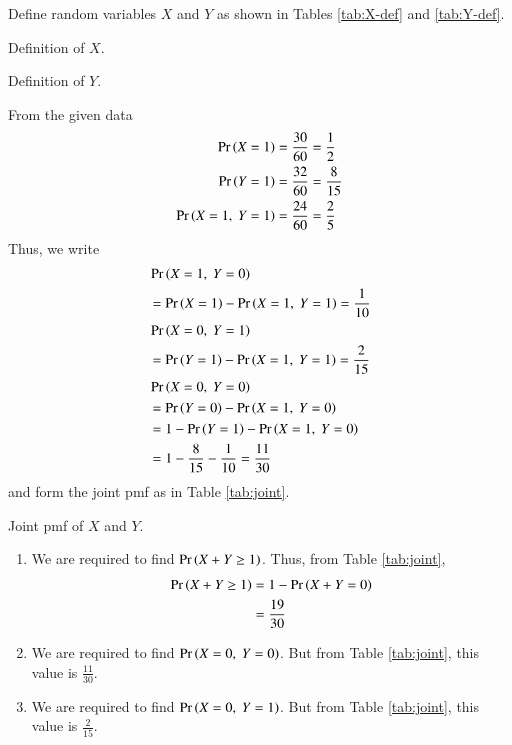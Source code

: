 \documentclass[journal,12pt,twocolumn]{IEEEtran}
\begin{document}
\begin{enumerate}
    \solution Define random variables $X$ and $Y$ as shown
    in Tables \ref{tab:X-def} and \ref{tab:Y-def}.
    \begin{table}[H]
        \centering
        
        \caption{Definition of $X$.}
        \label{tab:X-def}
    \end{table}
    \begin{table}[H]
        \centering
        
        \caption{Definition of $Y$.}
        \label{tab:Y-def}
    \end{table}
    From the given data
    \begin{align}
        \Pr\left(X=1\right) &= \frac{30}{60} = \frac{1}{2} \label{eq:pr-X} \\
        \Pr\left(Y=1\right) &= \frac{32}{60} = \frac{8}{15} \label{eq:pr-Y} \\
        \Pr\left(X=1,\ Y=1\right) &= \frac{24}{60} = \frac{2}{5} \label{eq:pr-XY}
    \end{align}
    Thus, we write
    \begin{align}
        &\Pr\left(X=1,\ Y=0\right) \nonumber \\
        &= \Pr\left(X=1\right) - \Pr\left(X=1,\ Y=1\right) = \frac{1}{10} \\
        &\Pr\left(X=0,\ Y=1\right) \nonumber \\
        &= \Pr\left(Y=1\right) - \Pr\left(X=1,\ Y=1\right) = \frac{2}{15} \\
        &\Pr\left(X=0,\ Y=0\right) \nonumber \\
        &= \Pr\left(Y=0\right) - \Pr\left(X=1,\ Y=0\right) \\
        &= 1 - \Pr\left(Y=1\right) - \Pr\left(X=1,\ Y=0\right) \\
        &= 1 - \frac{8}{15} - \frac{1}{10} = \frac{11}{30}
    \end{align}
    and form the joint pmf as in Table \ref{tab:joint}.
    \begin{table}[H]
        \centering
        
        \caption{Joint pmf of $X$ and $Y$.}
        \label{tab:joint}
    \end{table}
    \begin{enumerate}
        \item We are required to find $\Pr\left(X+Y\ge1\right)$. Thus, from Table 
        \ref{tab:joint},
        \begin{align}
            \Pr\left(X+Y\ge1\right) &= 1 - \Pr\left(X+Y=0\right) \\
                         &= \frac{19}{30}
        \end{align}
        
        \item We are required to find $\pr{X=0,\ Y=0}$. But from Table \ref{tab:joint},
        this value is $\frac{11}{30}$.

        \item We are required to find $\pr{X=0,\ Y=1}$. But from Table \ref{tab:joint},
        this value is $\frac{2}{15}$.
    \end{enumerate}
\end{enumerate}
\end{document}
